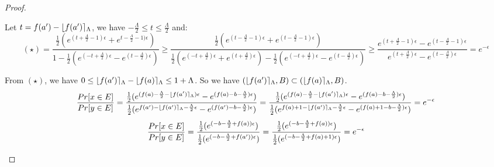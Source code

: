 \documentclass[a4paper,11pt]{article}
\begin{document}
\begin{proof}
\begin{itemize}
	Let $t = f(a') - \lfloor f(a') \rceil_{\Lambda}$, we have $-\frac{\Lambda}{2} \leq t \leq \frac{\Lambda}{2} $ and:
	\[
	(\star) = \frac{{\frac{1}{2}(
				e^{(t + \frac{\Lambda}{2} - 1)\epsilon}
				+ e^{t - \frac{\Lambda}{2} - 1)\epsilon})}
			}
			{1 - \frac{1}{2}(
				e^{(- t + \frac{\Lambda}{2})\epsilon}
				- e^{(t - \frac{\Lambda}{2})\epsilon})}
	\geq \frac{ \frac{1}{2}(
				e^{(t - \frac{\Lambda}{2} - 1)\epsilon}
				+ e^{(t -\frac{\Lambda}{2} - 1)\epsilon})
			}
			{\frac{1}{2}(
				e^{(-t + \frac{\Lambda}{2})\epsilon}
				+ e^{(t +\frac{\Lambda}{2})\epsilon}) 
				- \frac{1}{2}(
				e^{(-t + \frac{\Lambda}{2})\epsilon}
				- e^{(t - \frac{\Lambda}{2})\epsilon})}
	\geq \frac{
				e^{(t + \frac{\Lambda}{2} - 1)\epsilon}
				-
				e^{(t - \frac{\Lambda}{2} - 1)\epsilon}
			}
			{
				e^{(t + \frac{\Lambda}{2})\epsilon}
				- e^{(t - \frac{\Lambda}{2})\epsilon}
			}	
	= e^{-\epsilon}
	\]
	

	From $(\star)$, we have $0 \leq \lfloor f(a') \rceil_{\Lambda} - \lfloor f(a) \rceil_{\Lambda} \leq 1 + \Lambda$.
	So we have $(\lfloor f(a') \rceil_{\Lambda}, B) \subset (\lfloor f(a) \rceil_{\Lambda}, B)$.
	\[
	\frac{Pr[x \in E]}{Pr[y \in E]} 
	= \frac{\frac{1}{2}(
				e^{(f(a) - \frac{\Lambda}{2} - \lfloor f(a') \rceil_{\Lambda})\epsilon}
				- e^{(f(a) -b - \frac{\Lambda}{2})\epsilon})}
				{\frac{1}{2}(
				e^{f(a') - \lfloor f(a') \rceil_{\Lambda} -\frac{\Lambda}{2}\epsilon}
				- e^{(f(a') -b -\frac{\Lambda}{2})\epsilon})} \\
	= \frac{\frac{1}{2}(
				e^{(f(a) - \frac{\Lambda}{2} - \lfloor f(a') \rceil_{\Lambda})\epsilon}
				- e^{(f(a) -b - \frac{\Lambda}{2})\epsilon})}
				{\frac{1}{2}(
				e^{f(a) + 1 - \lfloor f(a') \rceil_{\Lambda} -\frac{\Lambda}{2}\epsilon}
				- e^{(f(a) + 1 -b -\frac{\Lambda}{2})\epsilon})} \\
	= e^{-\epsilon}
	\]
	\[
	\frac{Pr[x \in E]}{Pr[y \in E]} 
	= \frac{\frac{1}{2}(
				e^{(-b -\frac{\Lambda}{2} + f(a))\epsilon})}
				{\frac{1}{2}(
				e^{(-b -\frac{\Lambda}{2} + f(a'))\epsilon})} \\
	= \frac{\frac{1}{2}(
				e^{(-b -\frac{\Lambda}{2} + f(a))\epsilon})}
				{\frac{1}{2}(
				e^{(-b -\frac{\Lambda}{2} + f(a) + 1)\epsilon})} \\
	= e^{-\epsilon}
	\]



\end{itemize}

\end{proof}
\newpage


\end{document}
